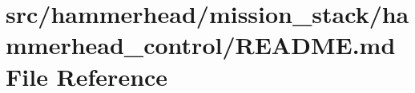 \hypertarget{mission__stack_2hammerhead__control_2README_8md}{}\section{src/hammerhead/mission\+\_\+stack/hammerhead\+\_\+control/\+R\+E\+A\+D\+ME.md File Reference}
\label{mission__stack_2hammerhead__control_2README_8md}
